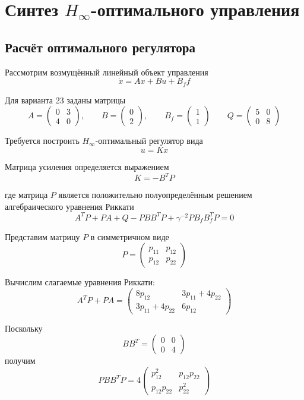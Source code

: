 
\section{Синтез $H_\infty$-оптимального управления}

\subsection{Расчёт оптимального регулятора}

Рассмотрим возмущённый линейный объект управления
\[
\dot{x}=Ax+Bu+B_f f
\]

Для варианта 23 заданы матрицы
\[
A=
\begin{pmatrix}
0&3\\
4&0
\end{pmatrix},
\qquad
B=
\begin{pmatrix}
0\\
2
\end{pmatrix},
\qquad
B_f=
\begin{pmatrix}
1\\
1
\end{pmatrix}
\qquad
Q=
\begin{pmatrix}
5&0\\
0&8
\end{pmatrix}
\]

Требуется построить $H_\infty$-оптимальный регулятор вида
\[
u=Kx
\]

Матрица усиления определяется выражением
\[
K=-B^TP
\]

где матрица $P$ является положительно полуопределённым
решением алгебраического уравнения Риккати
\[
A^TP+PA+Q-PBB^TP+
\gamma^{-2}PB_fB_f^TP=0
\]

Представим матрицу $P$ в симметричном виде
\[
P=
\begin{pmatrix}
p_{11}&p_{12}\\
p_{12}&p_{22}
\end{pmatrix}
\]

Вычислим слагаемые уравнения Риккати:
\[
A^TP+PA=
\begin{pmatrix}
8p_{12}&3p_{11}+4p_{22}\\
3p_{11}+4p_{22}&6p_{12}
\end{pmatrix}
\]

Поскольку
\[
BB^T=
\begin{pmatrix}
0&0\\
0&4
\end{pmatrix}
\]
получим
\[
PBB^TP=
4\begin{pmatrix}
p_{12}^2&p_{12}p_{22}\\
p_{12}p_{22}&p_{22}^2
\end{pmatrix}
\]

